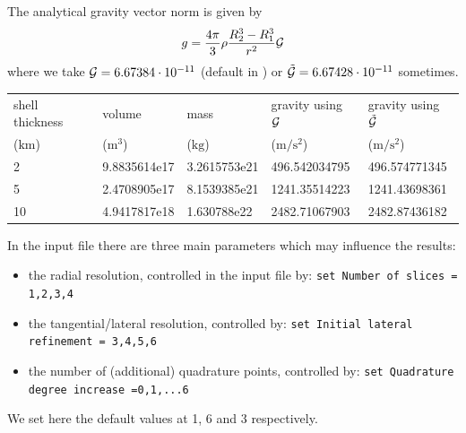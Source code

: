 The analytical gravity vector norm is given by 
\[
g = \frac{4\pi}{3}\rho \frac{R_2^3-R_1^3}{r^2} {\cal G} 
\]
where we take ${\cal G}=6.67384\cdot10^{-11}$ (default in \aspect{}) or $\tilde{\cal G}=6.67428\cdot 10^{-11}$ sometimes.

\begin{center}
\begin{tabular}{lllll}
\hline
shell thickness      & volume                 & mass                & gravity using ${\cal G}$          & gravity using $\tilde{\cal G}$    \\
($\si{\kilo\metre}$) &  ($\si{\cubic\metre}$) & ($\si{\kilo\gram}$) & ($\si{\metre\per\square\second}$) & ($\si{\metre\per\square\second}$) \\
\hline\hline
2 & 9.8835614e17 & 3.2615753e21 & 496.542034795 &  496.574771345 \\
5 & 2.4708905e17 & 8.1539385e21 & 1241.35514223 & 1241.43698361 \\
10& 4.9417817e18 & 1.630788e22  & 2482.71067903 & 2482.87436182 \\
\hline
\end{tabular}
\end{center}    

In the \aspect{} input file there are three main parameters which may influence the results:
\begin{itemize}
\item the radial resolution, controlled in the input file by: {\tt set Number of slices = 1,2,3,4}
\item the tangential/lateral resolution, controlled by: {\tt set Initial lateral refinement  = 3,4,5,6}
\item the number of (additional) quadrature points, controlled by: {\tt set Quadrature degree increase =0,1,...6}
\end{itemize}
We set here the default values at 1, 6 and 3 respectively.

